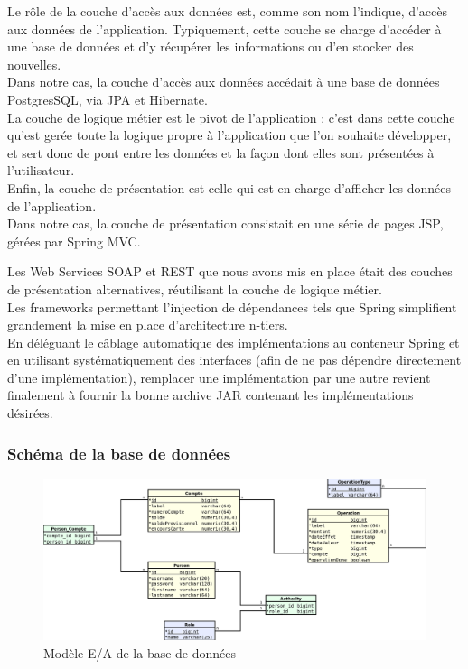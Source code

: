 Le rôle de la couche d'accès aux données est, comme son nom l'indique, d'accès aux données de l'application. Typiquement, cette couche se charge d'accéder à une base de données et d'y récupérer les informations ou d'en stocker des nouvelles.\\
 Dans notre cas, la couche d'accès aux données accédait à une base de données PostgresSQL, via JPA et Hibernate.\\

La couche de logique métier est le pivot de l'application : c'est dans cette couche qu'est gerée toute la logique propre à l'application que l'on souhaite développer, et sert donc de pont entre les données et la façon dont elles sont présentées à l'utilisateur.\\

Enfin, la couche de présentation est celle qui est en charge d'afficher les données de l'application.\\
 Dans notre cas, la couche de présentation consistait en une série  de pages JSP, gérées par Spring MVC.
 
 Les Web Services SOAP et REST que nous avons mis en place était des couches de présentation alternatives, réutilisant la couche de logique métier.\\
 
 Les frameworks permettant l'injection de dépendances tels que Spring simplifient grandement la mise en place d'architecture n-tiers.\\
 En déléguant le \og câblage \fg{} automatique des implémentations au conteneur Spring et en utilisant systématiquement des interfaces (afin de ne pas dépendre directement d'une implémentation), remplacer une implémentation par une autre revient finalement à fournir la bonne archive JAR contenant les implémentations désirées.  

\subsubsection{Schéma de la base de données}
\begin{figure}[h!]
	\centering
		\includegraphics[scale=0.25]{diagramme_modele.png} 
	\caption{Modèle E/A de la base de données}
\end{figure}

